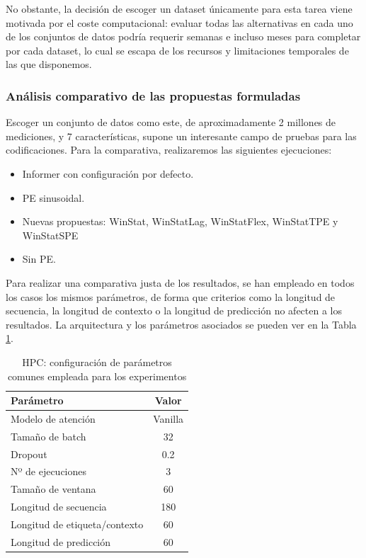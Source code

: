 No obstante, la decisión de escoger un dataset únicamente para esta tarea viene motivada por el coste computacional: evaluar todas las alternativas en cada uno de los conjuntos de datos podría requerir semanas e incluso meses para completar por cada dataset, lo cual se escapa de los recursos y limitaciones temporales de las que disponemos.

\subsubsection{Análisis comparativo de las propuestas formuladas}

Escoger un conjunto de datos como este, de aproximadamente 2 millones de mediciones, y 7 características, supone un interesante campo de pruebas para las codificaciones. Para la comparativa, realizaremos las siguientes ejecuciones:

\begin{itemize}
	\item Informer con configuración por defecto.
	\item PE sinusoidal.
	\item Nuevas propuestas: WinStat, WinStatLag, WinStatFlex,  WinStatTPE y WinStatSPE	
	\item Sin PE.
\end{itemize}

Para realizar una comparativa justa de los resultados, se han empleado en todos los casos los mismos parámetros, de forma que criterios como la longitud de secuencia, la longitud de contexto o la longitud de predicción no afecten a los resultados. La arquitectura y los parámetros asociados se pueden ver en la Tabla \ref{ajustes}.

\begin{table}[!ht]
	\centering
	\begin{tabular}{l|c}
		\toprule
		Parámetro & Valor \\
		\midrule
		{Modelo de atención} & Vanilla \\
		{Tamaño de batch} & 32 \\
		{Dropout} & 0.2 \\
		{Nº de ejecuciones} & 3 \\
		{Tamaño de ventana} & 60 \\
		{Longitud de secuencia} & 180 \\
		{Longitud de etiqueta/contexto} & 60 \\
		{Longitud de predicción} & 60 \\
		\bottomrule
	\end{tabular}
	\caption{HPC: configuración de parámetros comunes empleada para los experimentos}
	\label{ajustes}
\end{table}

